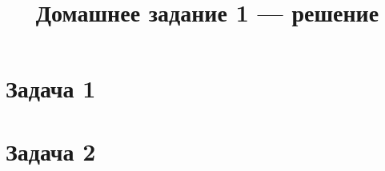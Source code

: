 \documentclass{article}
\title{Домашнее задание 1 — решение}
\author{}
\date{}
\begin{document}
\maketitle

\section*{Задача 1}

\section*{Задача 2}
\end{document}
